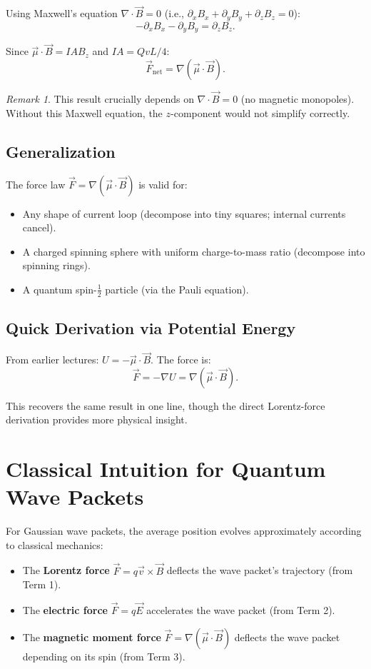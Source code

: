 \documentclass[11pt,a4paper]{article}
\theoremstyle{definition}
\theoremstyle{plain}
\theoremstyle{remark}
\newtheorem{remark}{Remark}[section]
\begin{document}
Using Maxwell's equation $\nabla\cdot\vec{B} = 0$ (i.e., $\partial_x B_x + \partial_y B_y + \partial_z B_z = 0$):
\[
    -\partial_x B_x - \partial_y B_y = \partial_z B_z.
\]

Since $\vec{\mu}\cdot\vec{B} = IAB_z$ and $IA = QvL/4$:
\[
    \boxed{\vec{F}_{\text{net}} = \nabla(\vec{\mu}\cdot\vec{B}).}
\]

\begin{remark}
    This result crucially depends on $\nabla\cdot\vec{B} = 0$ (no magnetic monopoles). Without this Maxwell equation, the $z$-component would not simplify correctly.
\end{remark}

\subsection{Generalization}

The force law $\vec{F} = \nabla(\vec{\mu}\cdot\vec{B})$ is valid for:
\begin{itemize}
    \item Any shape of current loop (decompose into tiny squares; internal currents cancel).
    \item A charged spinning sphere with uniform charge-to-mass ratio (decompose into spinning rings).
    \item A quantum spin-$\frac{1}{2}$ particle (via the Pauli equation).
\end{itemize}

\subsection{Quick Derivation via Potential Energy}

From earlier lectures: $U = -\vec{\mu}\cdot\vec{B}$. The force is:
\[
    \vec{F} = -\nabla U = \nabla(\vec{\mu}\cdot\vec{B}).
\]

This recovers the same result in one line, though the direct Lorentz-force derivation provides more physical insight.

\section{Classical Intuition for Quantum Wave Packets}

For Gaussian wave packets, the average position evolves approximately according to classical mechanics:
\begin{itemize}
    \item The \textbf{Lorentz force} $\vec{F} = q\vec{v}\times\vec{B}$ deflects the wave packet's trajectory (from Term 1).
    \item The \textbf{electric force} $\vec{F} = q\vec{E}$ accelerates the wave packet (from Term 2).
    \item The \textbf{magnetic moment force} $\vec{F} = \nabla(\vec{\mu}\cdot\vec{B})$ deflects the wave packet depending on its spin (from Term 3).
\end{itemize}
\end{document}

